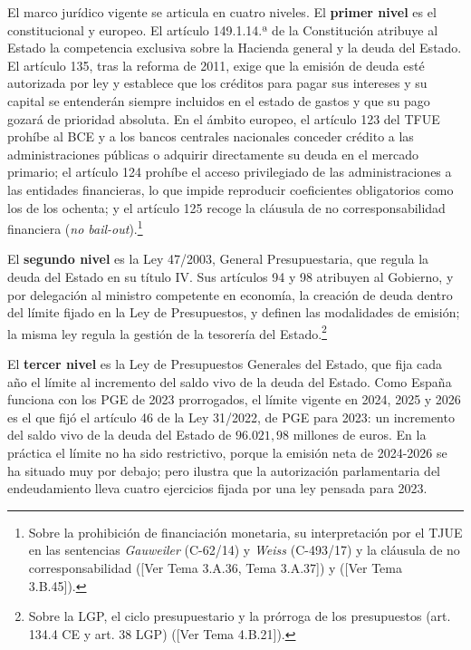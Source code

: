 \documentclass[10pt,a4paper]{article}
\newcommand{\authorfont}[1]{{\fontfamily{EBGaramond-TLF}\selectfont #1}}
\begin{document}
El marco jurídico vigente se articula en cuatro niveles. El \textbf{primer nivel} es el constitucional y europeo. El artículo 149.1.14.ª de la Constitución atribuye al Estado la competencia exclusiva sobre la Hacienda general y la deuda del Estado. El artículo 135, tras la reforma de 2011, exige que la emisión de deuda esté autorizada por ley y establece que los créditos para pagar sus intereses y su capital se entenderán siempre incluidos en el estado de gastos y que su pago gozará de prioridad absoluta. En el ámbito europeo, el artículo 123 del TFUE prohíbe al BCE y a los bancos centrales nacionales conceder crédito a las administraciones públicas o adquirir directamente su deuda en el mercado primario; el artículo 124 prohíbe el acceso privilegiado de las administraciones a las entidades financieras, lo que impide reproducir coeficientes obligatorios como los de los ochenta; y el artículo 125 recoge la cláusula de no corresponsabilidad financiera (\textit{no bail-out}).\footnote{%
    Sobre la prohibición de financiación monetaria, su interpretación por el TJUE en las sentencias \textit{Gauweiler} (C-62/14) y \textit{Weiss} (C-493/17) y la cláusula de no corresponsabilidad ([\authorfont{Ver Tema 3.A.36, Tema 3.A.37}]) y ([\authorfont{Ver Tema 3.B.45}]).
}

El \textbf{segundo nivel} es la Ley 47/2003, General Presupuestaria, que regula la deuda del Estado en su título IV. Sus artículos 94 y 98 atribuyen al Gobierno, y por delegación al ministro competente en economía, la creación de deuda dentro del límite fijado en la Ley de Presupuestos, y definen las modalidades de emisión; la misma ley regula la gestión de la tesorería del Estado.\footnote{%
    Sobre la LGP, el ciclo presupuestario y la prórroga de los presupuestos (art. 134.4 CE y art. 38 LGP) ([\authorfont{Ver Tema 4.B.21}]).
}

El \textbf{tercer nivel} es la Ley de Presupuestos Generales del Estado, que fija cada año el límite al incremento del saldo vivo de la deuda del Estado. Como España funciona con los PGE de 2023 prorrogados, el límite vigente en 2024, 2025 y 2026 es el que fijó el artículo 46 de la Ley 31/2022, de PGE para 2023: un incremento del saldo vivo de la deuda del Estado de $96{.}021,98$ millones de euros. En la práctica el límite no ha sido restrictivo, porque la emisión neta de 2024-2026 se ha situado muy por debajo; pero ilustra que la autorización parlamentaria del endeudamiento lleva cuatro ejercicios fijada por una ley pensada para 2023.
\end{document}
